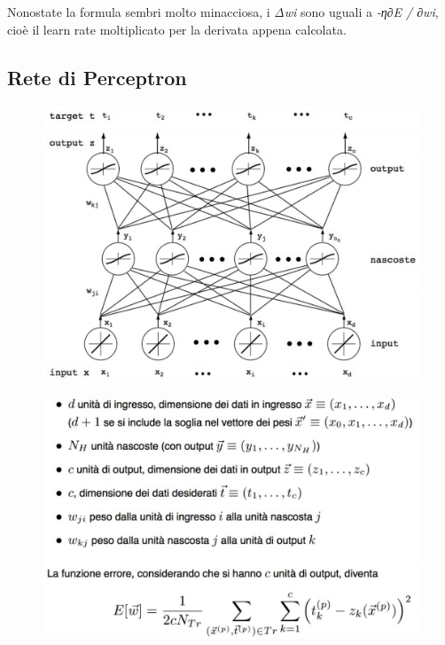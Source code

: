 Nonostate la formula sembri molto minacciosa, i \emph{Δwi} sono uguali a
\emph{-η∂E / ∂wi}, cioè il learn rate moltiplicato per la derivata
appena calcolata.

\subsection{Rete di Perceptron}\label{rete-di-perceptron}

\begin{figure}[htbp]
\centering
\includegraphics{./notes/immagini/l10-rete.png}
\caption{}
\end{figure}

\begin{figure}[htbp]
\centering
\includegraphics{./notes/immagini/l10-rete-parametri.png}
\caption{}
\end{figure}

